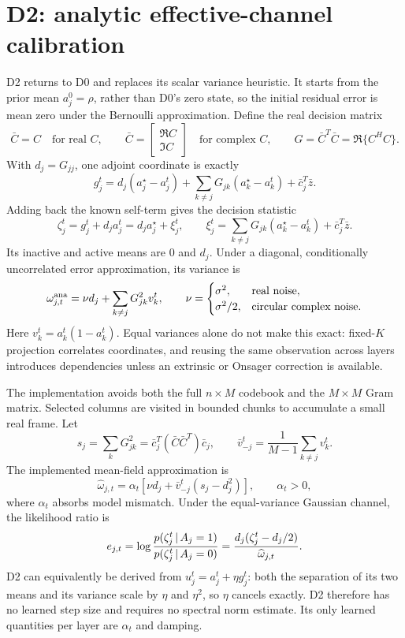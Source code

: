 \documentclass[11pt]{article}
\begin{document}
\section{D2: analytic effective-channel calibration}

D2 returns to D0 and replaces its scalar variance heuristic. It starts from the prior mean $a_j^0=\rho$, rather than
D0's zero state, so the initial residual error is mean zero under the Bernoulli approximation. Define the real decision matrix
\[
 \bar C=C\quad\text{for real $C$},
 \qquad
 \bar C=\begin{bmatrix}\Re C\\ \Im C\end{bmatrix}\quad\text{for complex $C$},
 \qquad G=\bar C^T\bar C=\Re\{C^HC\}.
\]
With $d_j=G_{jj}$, one adjoint coordinate is exactly
\[
 g_j^t=d_j(a_j^\star-a_j^t)
 +\sum_{k\ne j}G_{jk}(a_k^\star-a_k^t)+\bar c_j^T\bar z.
\]
Adding back the known self-term gives the decision statistic
\[
 \zeta_j^t=g_j^t+d_ja_j^t=d_ja_j^\star+\xi_j^t,
 \qquad
 \xi_j^t=\sum_{k\ne j}G_{jk}(a_k^\star-a_k^t)+\bar c_j^T\bar z.
\]
Its inactive and active means are $0$ and $d_j$. Under a diagonal, conditionally uncorrelated error approximation, its
variance is
\[
 \omega_{j,t}^{\rm ana}=\nu d_j+\sum_{k\ne j}G_{jk}^2v_k^t,
 \qquad
 \nu=\begin{cases}\sigma^2,&\text{real noise},\\ \sigma^2/2,&\text{circular complex noise}.
 \end{cases}
\]
Here $v_k^t=a_k^t(1-a_k^t)$. Equal variances alone do not make this exact: fixed-$K$ projection correlates coordinates,
and reusing the same observation across layers introduces dependencies unless an extrinsic or Onsager correction is
available.

The implementation avoids both the full $n\times M$ codebook and the $M\times M$ Gram matrix. Selected columns are
visited in bounded chunks to accumulate a small real frame. Let
\[
 s_j=\sum_kG_{jk}^2
 =\bar c_j^T(\bar C\bar C^T)\bar c_j,
 \qquad
 \bar v_{-j}^t=\frac{1}{M-1}\sum_{k\ne j}v_k^t.
\]
The implemented mean-field approximation is
\[
 \widehat\omega_{j,t}=\alpha_t\left[\nu d_j+\bar v_{-j}^t(s_j-d_j^2)\right],
 \qquad \alpha_t>0,
\]
where $\alpha_t$ absorbs model mismatch. Under the equal-variance Gaussian channel, the likelihood ratio is
\[
 e_{j,t}=\log\frac{p(\zeta_j^t\,|\, A_j=1)}{p(\zeta_j^t\,|\, A_j=0)}
 =\frac{d_j(\zeta_j^t-d_j/2)}{\widehat\omega_{j,t}}.
\]
D2 can equivalently be derived from $u_j^t=a_j^t+\eta g_j^t$: both the separation of its two means and its variance
scale by $\eta$ and $\eta^2$, so $\eta$ cancels exactly. D2 therefore has no learned step size and requires no spectral
norm estimate. Its only learned quantities per layer are $\alpha_t$ and damping.
\end{document}
